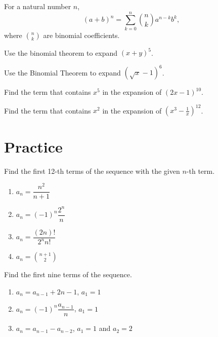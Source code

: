 \begin{theorem}
For a natural number $n$, 
\[
(a+b)^n = \sum_{k=0}^n \binom{n}{k} a^{n-k} b^{k},
\]
where $\binom{n}{k}$ are binomial coefficients.
\end{theorem}

\begin{example}
    Use the binomial theorem to expand $(x+y)^5$.
\end{example}
\vspace*{6\baselineskip}

\begin{example}
    Use the Binomial Theorem to expand $(\sqrt{x}-1)^6$.
\end{example}
\vspace*{6\baselineskip}

\begin{example}
    Find the term that contains $x^5$ in the expansion of $(2x-1)^{10}$.
\end{example}
\vspace*{6\baselineskip}

\begin{example}
    Find the term that contains $x^2$ in the expansion of $\left(x^3-\frac{1}{x}\right)^{12}$.
\end{example}
\vspace*{6\baselineskip}

\section*{Practice}

\begin{exercise}
    Find the first 12-th terms of the sequence with the given $n$-th term.
\begin{enumerate}[itemsep=0.5\baselineskip,, after=\vspace*{0.5\baselineskip}]
    \item $a_n=\dfrac{n^2}{n+1}$
    \item $a_n=(-1)^n\dfrac{2^n}{n}$
    \item $a_n=\dfrac{(2n)!}{2^nn!}$
    \item $a_n=\binom{n+1}{2}$
\end{enumerate}
\end{exercise}
\begin{exercise}
    Find the first nine terms of the sequence.
\begin{enumerate}[itemsep=0.5\baselineskip, after=\vspace*{0.5\baselineskip}]
    \item $a_n=a_{n-1}+2n-1$, $a_1=1$
    \item $a_n=(-1)^n\dfrac{a_{n-1}}{n}$, $a_1=1$
    \item $a_n=a_{n-1}-a_{n-2}$, $a_1=1$ and $a_2=2$
\end{enumerate}
\end{exercise}

